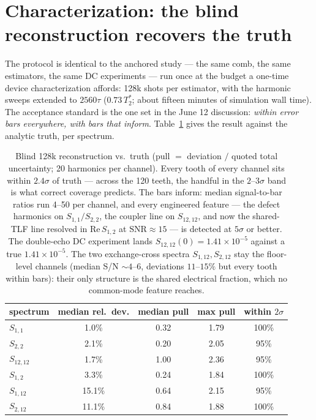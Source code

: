 \documentclass[10pt]{article}
\begin{document}
\section{Characterization: the blind reconstruction recovers the truth}
\label{sec:char}

The protocol is identical to the anchored study --- the same comb, the same
estimators, the same DC experiments --- run once at the budget a one-time
device characterization affords: 128k shots per estimator, with the harmonic
sweeps extended to $2560\tau$ ($0.73\,T_2^*$; about fifteen minutes of
simulation wall time). The acceptance standard is the one set in the June 12
discussion: \emph{within error bars everywhere, with bars that inform}.
Table~\ref{tab:recon} gives the result against the analytic truth,
per spectrum.

\begin{table}[h!]
\centering\small
\begin{tabular}{lcccc}
\toprule
spectrum & median rel.\ dev. & median pull & max pull & within $2\sigma$ \\
\midrule
$S_{1,1}$    & 1.0\% & 0.32 & 1.79 & 100\% \\
$S_{2,2}$    & 2.1\% & 0.20 & 2.05 & 95\% \\
$S_{12,12}$  & 1.7\% & 1.00 & 2.36 & 95\% \\
$S_{1,2}$    & 3.3\% & 0.24 & 1.84 & 100\% \\
$S_{1,12}$   & 15.1\% & 0.64 & 2.15 & 95\% \\
$S_{2,12}$   & 11.1\% & 0.84 & 1.88 & 100\% \\
\bottomrule
\end{tabular}
\caption{Blind 128k reconstruction vs.\ truth (pull $=$ deviation $/$ quoted
total uncertainty; 20 harmonics per channel). Every tooth of every channel
sits within $2.4\sigma$ of truth --- across the 120 teeth, the handful in
the $2$--$3\sigma$ band is what correct coverage predicts. The bars inform:
median signal-to-bar ratios run 4--50 per channel, and every engineered
feature --- the defect harmonics on $S_{1,1}/S_{2,2}$, the coupler line on
$S_{12,12}$, and now the shared-TLF line resolved in $\mathrm{Re}\,S_{1,2}$ at
$\mathrm{SNR}\approx 15$ --- is detected at $5\sigma$ or better. The
double-echo DC experiment lands $S_{12,12}(0) = 1.41\times10^{-5}$ against a
true $1.41\times10^{-5}$. The two exchange-cross spectra $S_{1,12}, S_{2,12}$
stay the floor-level channels (median S/N $\sim 4$--$6$, deviations
$11$--$15\%$ but every tooth within bars): their only structure is the shared
electrical fraction, which no common-mode feature reaches.}
\label{tab:recon}
\end{table}
\end{document}
